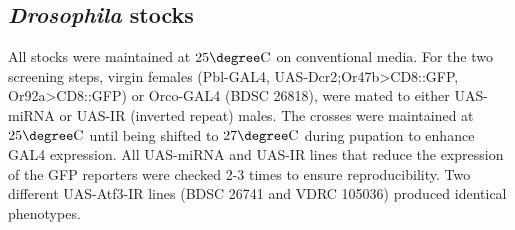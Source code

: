 \subsection*{\emph{Drosophila} stocks}

All stocks were maintained at $25\degree\mathrm{C}$ on conventional media.
For the two screening steps, virgin females (Pbl-GAL4, UAS-Dcr2;Or47b\textgreater{}CD8::GFP, Or92a\textgreater{}CD8::GFP) or Orco-GAL4 (BDSC 26818), were mated to either UAS-miRNA or UAS-IR (inverted repeat) males.
The crosses were maintained at $25\degree\mathrm{C}$ until being shifted to $27\degree\mathrm{C}$ during pupation to enhance GAL4 expression.
All UAS-miRNA and UAS-IR lines that reduce the expression of the GFP reporters were checked 2-3 times to ensure reproducibility.
Two different UAS-Atf3-IR lines (BDSC 26741 and VDRC 105036) produced identical phenotypes.